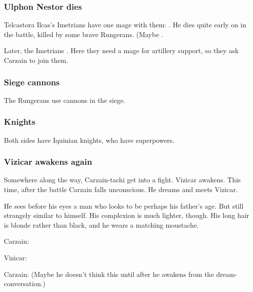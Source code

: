 \subsubsection{Ulphon Nestor dies}
Telcastora Ilcas's Imetrians have one mage with them: 
. 
He dies quite early on in the battle, killed by some brave Rungerans. 
(Maybe . 

Later, the Imetrians .
Here they need a mage for artillery support, so they ask Carzain to join them. 





\subsubsection{Siege cannons}
The Rungerans use cannons in the siege. 





\subsubsection{Knights}
Both sides have Iquinian knights, who have superpowers.





\subsubsection{Vizicar awakens again}
Somewhere along the way, Carzain-tachi get into a fight. Vizicar awakens. This time, after the battle Carzain falls unconscious. He dreams and meets Vizicar. 

He sees before his eyes a man who looks to be perhaps his father's age. 
But still strangely similar to himself. 
His complexion is much lighter, though. 
His long hair is blonde rather than black, and he wears a matching moustache. 

Carzain: 

Vizicar: 

Carzain: 
(Maybe he doesn't think this until after he awakens from the dream-conversation.)

